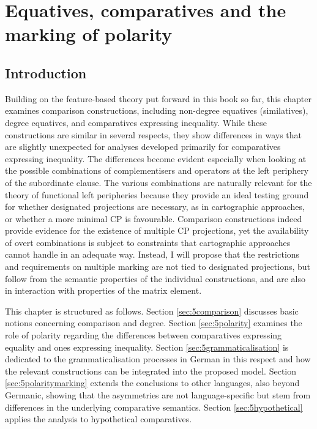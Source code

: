 \chapter{Equatives, comparatives and the marking of polarity} \label{ch:5}
\section{Introduction} \label{sec:5introduction}
Building on the feature-based theory put forward in this book so far, this chapter examines comparison constructions, including non-degree equatives (similatives), degree equatives, and comparatives expressing inequality. While these constructions are similar in several respects, they show differences in ways that are slightly unexpected for analyses developed primarily for comparatives expressing inequality. The differences become evident especially when looking at the possible combinations of complementisers and operators at the left periphery of the subordinate clause. The various combinations are naturally relevant for the theory of functional left peripheries because they provide an ideal testing ground for whether designated projections are necessary, as in cartographic approaches, or whether a more minimal CP is favourable. Comparison constructions indeed provide evidence for the existence of multiple CP projections, yet the availability of overt combinations is subject to constraints that cartographic approaches cannot handle in an adequate way. Instead, I will propose that the restrictions and requirements on multiple marking are not tied to designated projections, but follow from the semantic properties of the individual constructions, and are also in interaction with properties of the matrix element.

This chapter is structured as follows. Section \ref{sec:5comparison} discusses basic notions concerning comparison and degree. Section \ref{sec:5polarity} examines the role of polarity regarding the differences between comparatives expressing equality and ones expressing inequality. Section \ref{sec:5grammaticalisation} is dedicated to the grammaticalisation processes in German in this respect and how the relevant constructions can be integrated into the proposed model. Section \ref{sec:5polaritymarking} extends the conclusions to other languages, also beyond Germanic, showing that the asymmetries are not language-specific but stem from differences in the underlying comparative semantics. Section \ref{sec:5hypothetical} applies the analysis to hypothetical comparatives.

